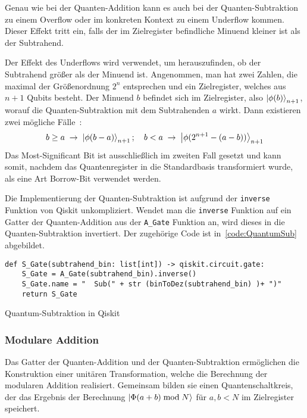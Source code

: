 Genau wie bei der Quanten-Addition kann es auch bei der Quanten-Subtraktion zu einem Overflow
oder im konkreten Kontext zu einem Underflow kommen.
Dieser Effekt tritt ein, 
falls der im Zielregister befindliche Minuend kleiner ist als der Subtrahend.

Der Effekt des Underflows wird verwendet, um herauszufinden, 
ob der Subtrahend größer als der Minuend ist.
Angenommen, man hat zwei Zahlen, 
die maximal der Größenordnung \(2^n\) entsprechen und 
ein Zielregister, 
welches aus \(n+1\) Qubits besteht.
Der Minuend \(b\) befindet sich im Zielregister, 
also \(\ket{\phi(b)}_{n+1}\), 
worauf die Quanten-Subtraktion mit dem Subtrahenden \(a\) wirkt.
Dann existieren zwei mögliche Fälle~\cite{beauregard2003circuit}:
\[b \geq a\;\rightarrow\;\ket{\phi(b-a)}_{n+1};\quad
b < a \;\rightarrow\;\ket{\phi(2^{n+1}-(a-b))}_{n+1}
  \]
Das Most-Significant Bit ist ausschließlich im zweiten Fall gesetzt und kann somit, 
nachdem das Quantenregister in die Standardbasis transformiert wurde, 
als eine Art Borrow-Bit verwendet werden.

Die Implementierung der Quanten-Subtraktion ist aufgrund der \texttt{inverse} Funktion von Qiskit unkompliziert.
Wendet man die \texttt{inverse} Funktion auf ein Gatter der Quanten-Addition aus der \texttt{A_Gate} Funktion an, 
wird dieses in die Quanten-Subtraktion invertiert.
Der zugehörige Code ist in~\ref{code:QuantumSub} abgebildet.
\begin{listing}[H]
\begin{verbatim}    
def S_Gate(subtrahend_bin: list[int]) -> qiskit.circuit.gate:
    S_Gate = A_Gate(subtrahend_bin).inverse()
    S_Gate.name = "  Sub(" + str (binToDez(subtrahend_bin) )+ ")"
    return S_Gate
  \end{verbatim}
  \caption{Quantum-Subtraktion in Qiskit}
  \label{code:QuantumSub}
\end{listing}

\subsubsection{Modulare Addition} \label{sub:modulareAddition}
Das Gatter der Quanten-Addition und der Quanten-Subtraktion ermöglichen die Konstruktion einer unitären Transformation, 
welche die Berechnung der modularen Addition realisiert.
Gemeinsam bilden sie einen Quantenschaltkreis, 
der das Ergebnis der Berechnung \(\ket{\Phi(a+b)\bmod N}\) für \(a, b < N\) im Zielregister speichert.

